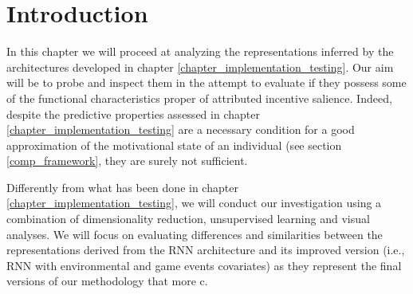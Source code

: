 \section{Introduction}
\label{representation_analysis_introduction}
In this chapter we will proceed at analyzing the representations inferred by the architectures developed in chapter \ref{chapter_implementation_testing}. Our aim will be to probe and inspect them in the attempt to evaluate if they possess some of the functional characteristics proper of attributed incentive salience. Indeed, despite the predictive properties assessed in chapter \ref{chapter_implementation_testing} are a necessary condition for a good approximation of the motivational state of an individual (see section \ref{comp_framework}, they are surely not sufficient. 

Differently from what has been done in chapter \ref{chapter_implementation_testing}, we will conduct our investigation using  a combination of dimensionality reduction, unsupervised learning and visual analyses. We will focus on evaluating differences and similarities between the representations derived from the RNN architecture and its improved version (i.e., RNN with environmental and game events covariates) as they represent the final versions of our methodology that more c. 

